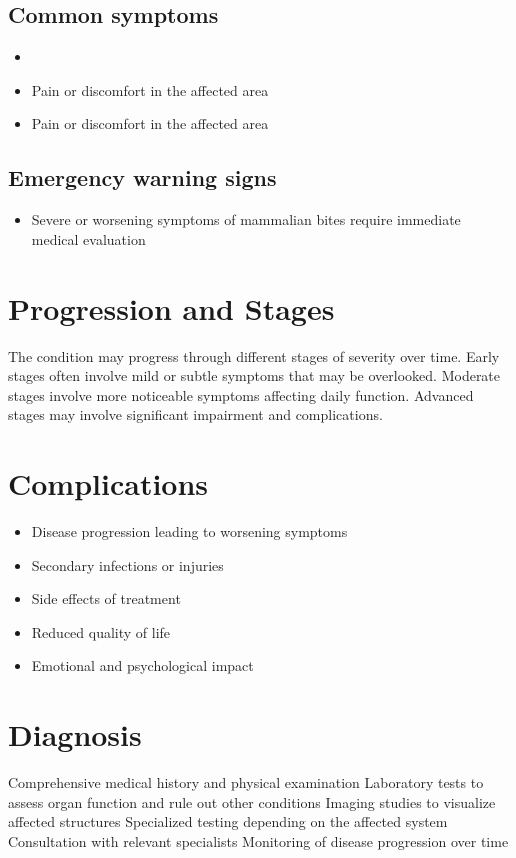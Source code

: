 \subsection{Common symptoms}
\begin{itemize}[noitemsep]
  \item \item Pain or discomfort in the affected area    \item Pain or discomfort in the affected area
  \end{itemize}

\subsection{Emergency warning signs}
\begin{itemize}[noitemsep]
  \item Severe or worsening symptoms of mammalian bites require immediate medical evaluation
\end{itemize}
\section{Progression and Stages}
The condition may progress through different stages of severity over time. Early stages often involve mild or subtle symptoms that may be overlooked. Moderate stages involve more noticeable symptoms affecting daily function. Advanced stages may involve significant impairment and complications.
\section{Complications}
\begin{itemize}[noitemsep]
  \item Disease progression leading to worsening symptoms
  \item Secondary infections or injuries
  \item Side effects of treatment
  \item Reduced quality of life
  \item Emotional and psychological impact
\end{itemize}
\section{Diagnosis}
Comprehensive medical history and physical examination Laboratory tests to assess organ function and rule out other conditions Imaging studies to visualize affected structures Specialized testing depending on the affected system Consultation with relevant specialists Monitoring of disease progression over time

